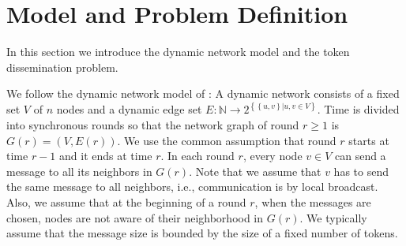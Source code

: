 \documentclass{llncs}
\newcommand{\set}[1]{\left\{#1\right\}}
\renewcommand{\paragraph}[1]{\medskip\noindent{\bf #1\ }}
\begin{document}
\iffalse

Lower Bounds:\\

$n \log k$	:	\cite{KLO}

$nk$	(for very restricted class of algorithms):	\cite{KLO}

$\frac{nk}{\log n}$	:	\cite{LBarxiv}


all lower bounds hold for centralized algorithms



Upper Bounds:

$nk$		\cite{KLO}

c-connected:	$nk/c$   (easy extension of \cite{KLO})

$\delta$-Gossip:	$nk\delta$  (easy extension of \cite{KLO})

T-interval-connectivity AND T-stability:  $nk/T$ \cite{KLO}\\

NC:	$O(\frac{nk}{\log n}$   (packet size = token size = $O(\log n)$)

NC T-stability:  $\min\{\frac{nk}{T^2} + T^2 n \log^2 n, \frac{nk \log n}{T^2} + T n \log^2 n, \frac{n^2 \log n}{T^2} + n \log n\}$	\cite{HK}

NC token size / packet size = l:   $O(\frac{nk}{\log n l^2})$ \cite{HK}

NC centralized:		$O(n + k)$ \cite{HK,AnalyzingNC}

NC centralized c-connected:	$O(n/c + k)$ \cite{HM}



network coding  \cite{ahlswede2000network}, random linear network coding \cite{ho2006random}

\fi


\section{Model and Problem Definition}
\label{sec:model}

In this section we introduce the dynamic network model and the token
dissemination problem.

\paragraph{Dynamic Networks:}
We follow the dynamic network model of \cite{KLO}: A dynamic network
consists of a fixed set $V$ of $n$ nodes and a dynamic edge set
$E:\mathbb{N}\to 2^{\set{\set{u,v}|u,v\in V}}$. Time is divided into
synchronous rounds so that the network graph of round $r\geq 1$ is
$G(r)=(V,E(r))$. We use the common assumption that round $r$ starts at
time $r-1$ and it ends at time $r$. In each round $r$, every node
$v\in V$ can send a message to all its neighbors in $G(r)$. Note that
we assume that $v$ has to send the same message to all neighbors,
i.e., communication is by local broadcast. Also, we assume that at the
beginning of a round $r$, when the messages are chosen, nodes are not
aware of their neighborhood in $G(r)$. We typically assume that the
message size is bounded by the size of a fixed number of tokens.
\end{document}
